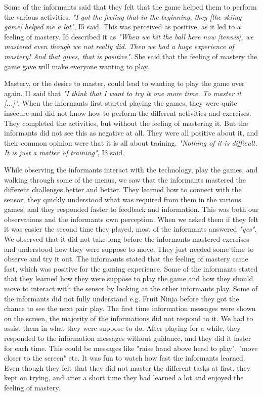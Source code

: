 Some of the informants said that they felt that the game helped them to perform the various activities. \emph{"I got the feeling that in the beginning, they [the skiing game] helped me a lot"}, I5 said. This was perceived as positive, as it led to a feeling of mastery. I6 described it as \emph{"When we hit the ball here now [tennis], we mastered even though we not really did. Then we had a huge experience of mastery! And that gives, that is positive"}. She said that the feeling of mastery the game gave will make everyone wanting to play.  

Mastery, or the desire to master, could lead to wanting to play the game over again. I1 said that \emph{"I think that I want to try it one more time. To master it [...]"}. When the informants first started playing the games, they were quite insecure and did not know how to perform the different activities and exercises. They completed the activities, but without the feeling of mastering it. But the informants did not see this as negative at all. They were all positive about it, and their common opinion were that it is all about training. \emph{"Nothing of it is difficult. It is just a matter of training"}, I3 said. 

While observing the informants interact with the technology, play the games, and walking through some of the menus, we saw that the informants mastered the different challenges better and better. They learned how to connect with the sensor, they quickly understood what was required from them in the various games, and they responded faster to feedback and information. This was both our observations and the informants own perception. When we asked them if they felt it was easier the second time they played, most of the informants answered \emph{"yes"}. We observed that it did not take long before the informants mastered exercises and understood how they were suppose to move. They just needed some time to observe and try it out. The informants stated that the feeling of mastery came fast, which was positive for the gaming experience. Some of the informants stated that they learned how they were suppose to play the game and how they should move to interact with the sensor by looking at the other informants play. Some of the informants did not fully understand e.g. Fruit Ninja before they got the chance to see the next pair play. The first time information messages were shown on the screen, the majority of the informations did not respond to it. We had to assist them in what they were suppose to do. After playing for a while, they responded to the information messages without guidance, and they did it faster for each time. This could be messages like "raise hand above head to play", "move closer to the screen" etc. It was fun to watch how fast the informants learned. Even though they felt that they did not master the different tasks at first, they kept on trying, and after a short time they had learned a lot and enjoyed the feeling of mastery. 


